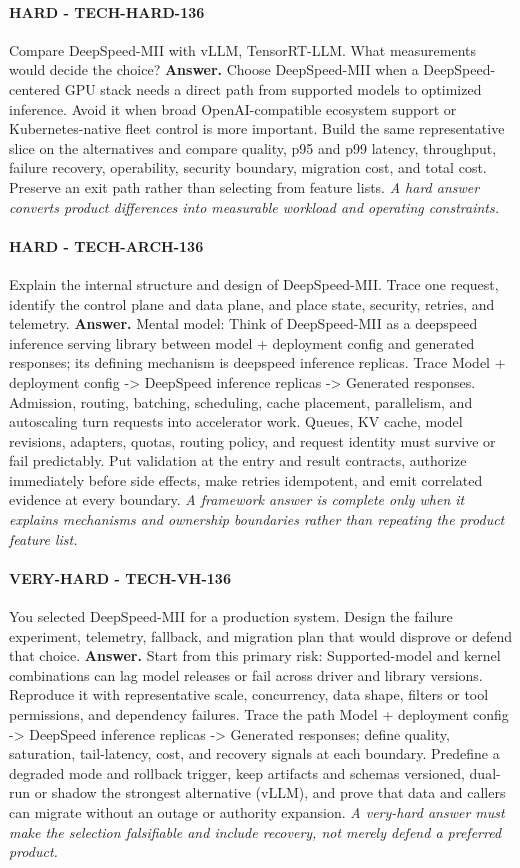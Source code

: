 \paragraph{HARD - TECH-HARD-136} Compare DeepSpeed-MII with vLLM, TensorRT-LLM. What measurements would decide the choice?
\textbf{Answer.} Choose DeepSpeed-MII when a DeepSpeed-centered GPU stack needs a direct path from supported models to optimized inference. Avoid it when broad OpenAI-compatible ecosystem support or Kubernetes-native fleet control is more important. Build the same representative slice on the alternatives and compare quality, p95 and p99 latency, throughput, failure recovery, operability, security boundary, migration cost, and total cost. Preserve an exit path rather than selecting from feature lists.
\textit{A hard answer converts product differences into measurable workload and operating constraints.}
\paragraph{HARD - TECH-ARCH-136} Explain the internal structure and design of DeepSpeed-MII. Trace one request, identify the control plane and data plane, and place state, security, retries, and telemetry.
\textbf{Answer.} Mental model: Think of DeepSpeed-MII as a deepspeed inference serving library between model + deployment config and generated responses; its defining mechanism is deepspeed inference replicas. Trace Model + deployment config -> DeepSpeed inference replicas -> Generated responses. Admission, routing, batching, scheduling, cache placement, parallelism, and autoscaling turn requests into accelerator work. Queues, KV cache, model revisions, adapters, quotas, routing policy, and request identity must survive or fail predictably. Put validation at the entry and result contracts, authorize immediately before side effects, make retries idempotent, and emit correlated evidence at every boundary.
\textit{A framework answer is complete only when it explains mechanisms and ownership boundaries rather than repeating the product feature list.}
\paragraph{VERY-HARD - TECH-VH-136} You selected DeepSpeed-MII for a production system. Design the failure experiment, telemetry, fallback, and migration plan that would disprove or defend that choice.
\textbf{Answer.} Start from this primary risk: Supported-model and kernel combinations can lag model releases or fail across driver and library versions. Reproduce it with representative scale, concurrency, data shape, filters or tool permissions, and dependency failures. Trace the path Model + deployment config -> DeepSpeed inference replicas -> Generated responses; define quality, saturation, tail-latency, cost, and recovery signals at each boundary. Predefine a degraded mode and rollback trigger, keep artifacts and schemas versioned, dual-run or shadow the strongest alternative (vLLM), and prove that data and callers can migrate without an outage or authority expansion.
\textit{A very-hard answer must make the selection falsifiable and include recovery, not merely defend a preferred product.}
